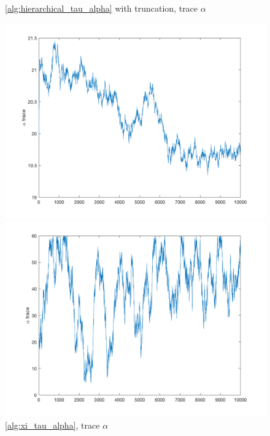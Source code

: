 \documentclass{siamart1116}
\begin{document}
\begin{figure}[H]
    \begin{minipage}{0.48\textwidth}
        \centering
        \caption{\label{fig:moon_centered_trace_alpha} \cref{alg:hierarchical_tau_alpha} with truncation, trace $\alpha$}
        \includegraphics[width=\linewidth]{graphics/moons/centered_truncated/trace_alpha.png}
    \end{minipage} \hfill
    \begin{minipage}{0.48\textwidth}
        \centering
        \caption{\label{fig:moon_noncentered_trace_alpha} \cref{alg:xi_tau_alpha}, trace $\alpha$}
        \includegraphics[width=\linewidth]{graphics/moons/noncentered_selftuning/trace_alpha.png}
    \end{minipage}
\end{figure}
\end{document}
